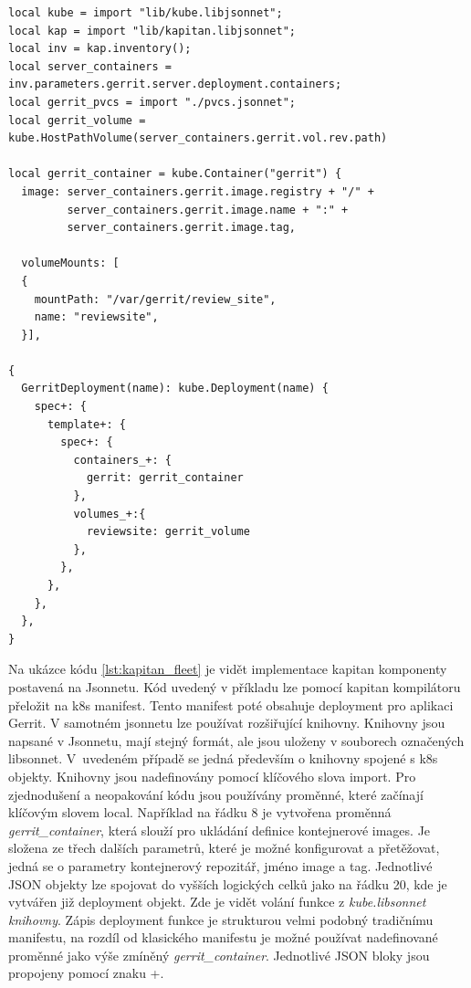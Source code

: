 \begin{lstlisting}[caption={Kapitan komponenta - využívající Jsonnet, zdroj: \cite{kapitan_fleet}},label={lst:kapitan_fleet}]
local kube = import "lib/kube.libjsonnet";
local kap = import "lib/kapitan.libjsonnet";
local inv = kap.inventory();
local server_containers = inv.parameters.gerrit.server.deployment.containers;
local gerrit_pvcs = import "./pvcs.jsonnet";
local gerrit_volume = kube.HostPathVolume(server_containers.gerrit.vol.rev.path)

local gerrit_container = kube.Container("gerrit") {
  image: server_containers.gerrit.image.registry + "/" +
         server_containers.gerrit.image.name + ":" +
         server_containers.gerrit.image.tag,

  volumeMounts: [
  {
    mountPath: "/var/gerrit/review_site",
    name: "reviewsite",
  }],

{
  GerritDeployment(name): kube.Deployment(name) {
    spec+: {
      template+: {
        spec+: {
          containers_+: {
            gerrit: gerrit_container
          },
          volumes_+:{
            reviewsite: gerrit_volume
          },
        },
      },
    },
  },
}
\end{lstlisting}

Na ukázce kódu \ref{lst:kapitan_fleet} je vidět implementace kapitan komponenty postavená na Jsonnetu. Kód uvedený v příkladu lze pomocí kapitan kompilátoru přeložit na k8s manifest. Tento manifest poté obsahuje deployment pro aplikaci Gerrit. V samotném jsonnetu lze používat rozšiřující knihovny. Knihovny jsou napsané v Jsonnetu, mají stejný formát, ale jsou uloženy v souborech označených libsonnet. V uvedeném případě se jedná především o knihovny spojené s k8s objekty. Knihovny jsou nadefinovány pomocí klíčového slova import. Pro zjednodušení a neopakování kódu jsou používány proměnné, které začínají klíčovým slovem local. Například na řádku 8 je vytvořena proměnná \textit{gerrit\_container}, která slouží pro ukládání definice kontejnerové images. Je složena ze třech dalších parametrů, které je možné konfigurovat a přetěžovat, jedná se o parametry kontejnerový repozitář, jméno image a tag. Jednotlivé JSON objekty lze spojovat do vyšších logických celků jako na řádku 20, kde je vytvářen již deployment objekt. Zde je vidět volání funkce z \textit{kube.libsonnet knihovny}. Zápis deployment funkce je strukturou velmi podobný tradičnímu manifestu, na rozdíl od klasického manifestu je možné používat nadefinované proměnné jako výše zmíněný \textit{gerrit\_container}. Jednotlivé JSON bloky jsou propojeny pomocí znaku +.

